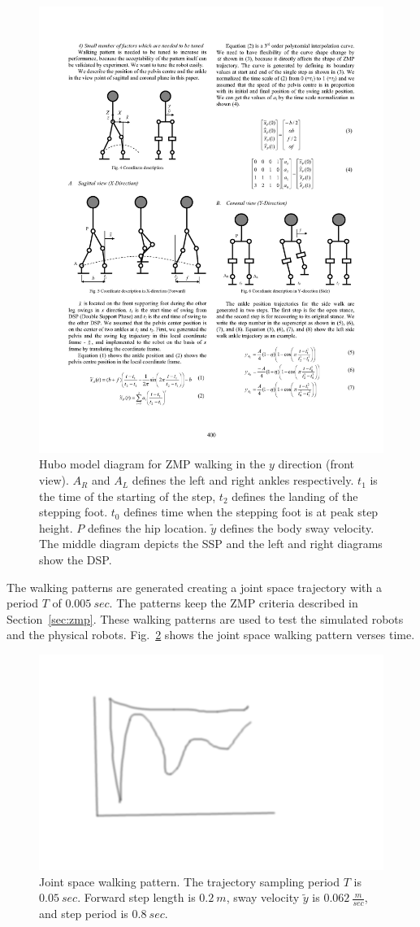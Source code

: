 \begin{figure}[t]
  \centering
\includegraphics[width=0.7\columnwidth]{./examples/pix/huboZMPy.pdf}
  \caption{Hubo model diagram for ZMP walking in the $y$ direction (front view).  $A_R$ and $A_L$ defines the left and right ankles respectively.  $t_1$ is the time of the starting of the step, $t_2$ defines the landing of the stepping foot.  $t_0$ defines time when the stepping foot is at peak step height.  $P$ defines the hip location.  $\widetilde{y}$ defines the body sway velocity.  The middle diagram depicts the SSP and the left and right diagrams show the DSP.}
  \label{fig:huboZMPy}
\end{figure}


The walking patterns are generated creating a joint space trajectory with a period $T$ of $0.005~sec$.
The patterns keep the ZMP criteria described in Section~\ref{sec:zmp}.
These walking patterns are used to test the simulated robots and the physical robots.
Fig.~\ref{fig:huboZMPjointSpace} shows the joint space walking pattern verses time.

\begin{figure}[t]
  \centering
\includegraphics[width=0.5\columnwidth]{./pix/tmp.png}
  \caption{Joint space walking pattern.  The trajectory sampling period $T$ is $0.05~sec$.  Forward step length is $0.2~m$, sway velocity $\widetilde{y}$ is $0.062~\frac{m}{sec}$, and step period is $0.8~sec$.}
  \label{fig:huboZMPjointSpace}
\end{figure}





